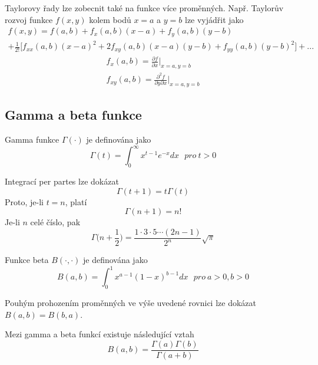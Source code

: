 \begin{definition}
Taylorovy řady lze zobecnit také na funkce více proměnných. Např. Taylorův rozvoj funkce $f(x,y)$ kolem bodů $x = a$ a $y = b$ lze vyjádřit jako
\begin{gather*}
f(x,y) = f(a,b) + f_x(a,b)(x - a) + f_y(a, b)(y - b)\\
+ \frac{1}{2!}\big[f_{xx}(a, b)(x - a)^2 + 2 f_{xy}(a, b)(x - a)(y - b) + f_{yy}(a, b)(y - b)^2 \big] + ...
\end{gather*}
\begin{gather*}
f_x(a, b) = \frac{\partial f}{\partial x} \Big|_{x = a, y = b}\\
f_{xy}(a, b) = \frac{\partial^2 f}{\partial y \partial x} \Big|_{x = a, y = b}
\end{gather*}
\end{definition}

\subsection{Gamma a beta funkce}

\begin{definition}
Gamma funkce $\Gamma(\cdot)$ je definována jako
\begin{equation*}
\Gamma(t) = \int_0^{\infty} x^{t - 1}e^{-x}dx ~~~\textit{pro}~ t > 0
\end{equation*}
\end{definition}

Integrací per partes lze dokázat
\begin{equation*}
\Gamma(t + 1) = t \Gamma(t)
\end{equation*}
Proto, je-li $t = n$, platí
\begin{equation*}
\Gamma(n + 1) = n!
\end{equation*}
Je-li $n$ celé číslo, pak
\begin{equation*}
\Gamma \big(n + \frac{1}{2} \big) = \frac{1 \cdot 3 \cdot 5 \cdots (2n - 1)}{2^n}\sqrt{\pi}
\end{equation*}

\begin{definition}
Funkce beta $B(\cdot, \cdot)$ je definována jako
\begin{equation*}
B(a, b) = \int_0^1 x^{a - 1}(1 - x)^{b - 1}dx ~~~\textit{pro}~ a > 0, b > 0
\end{equation*}
\end{definition}

Pouhým prohozením proměnných ve výše uvedené rovnici lze dokázat $B(a, b) = B(b, a)$.

Mezi gamma a beta funkcí existuje následující vztah
\begin{equation*}
B(a, b) = \frac{\Gamma(a) \Gamma(b)}{\Gamma(a + b)}
\end{equation*}


